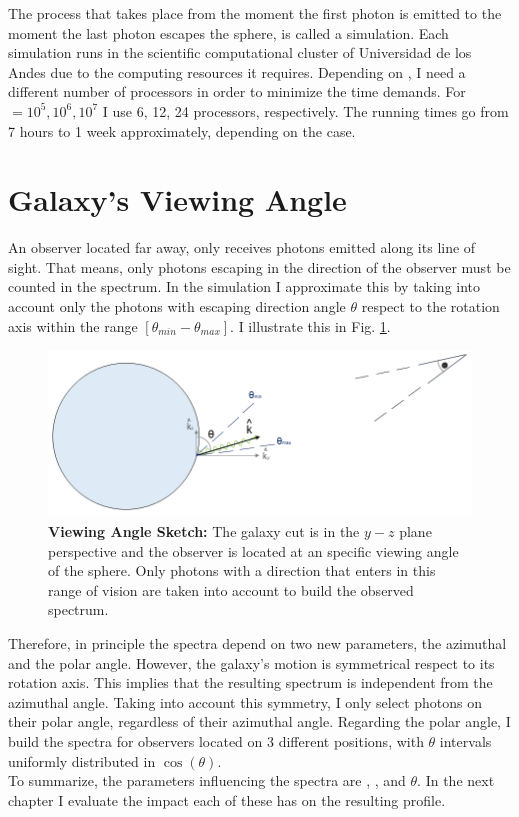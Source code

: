 The process that takes place from the moment the first photon is emitted to the moment the last photon escapes the sphere, is called a simulation. Each simulation runs in the scientific computational cluster of Universidad de los Andes due to the computing resources it requires. Depending on \tauh, I need a different number of processors in order to minimize the time demands. For \tauh $=10^5, 10^6, 10^7$ I use 6, 12, 24 processors, respectively. The running times go from 7 hours to 1 week approximately, depending on the case. \\

\section{Galaxy's Viewing Angle}
An observer located far away, only receives photons emitted along its line of sight. That means, only photons escaping in the direction of the observer must be counted in the spectrum. In the simulation I approximate this by taking into account only the photons with escaping direction angle $\theta$ respect to the rotation axis within the range $[\theta_{min}-\theta_{max}]$. I illustrate this in Fig. \ref{fig:viewing_angle_sketch}. \\

\begin{figure}[h!]
	\begin{center}
		\includegraphics[width=1\textwidth]{./figures/chapter2/viewing_angle_sketch}
	\end{center}
	\caption{\textbf{Viewing Angle Sketch:} The galaxy cut is in the $y-z$ plane perspective and the observer is located at an specific viewing angle of the sphere. Only photons with a direction that enters in this range of vision are taken into account to build the observed spectrum.
		\label{fig:viewing_angle_sketch}}
\end{figure}

Therefore, in principle the spectra depend on two new parameters, the azimuthal and the polar angle. However, the galaxy's motion is symmetrical respect to its rotation axis. This implies that the resulting spectrum is independent from the azimuthal angle. Taking into account this symmetry, I only select photons on their polar angle, regardless of their azimuthal angle. Regarding the polar angle, I build the spectra for observers located on 3 different positions, with $\theta$ intervals uniformly distributed in $\cos(\theta)$. \\ 

To summarize, the parameters influencing the spectra are \vrot, \vout, \tauh and $\theta$. In the next chapter I evaluate the impact each of these has on the resulting profile. 